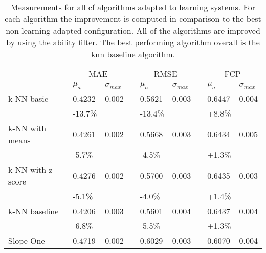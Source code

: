 \begin{sidewaystable}
    
    \centering
    \caption[Adapted collaborative filtering algorithms]{Measurements for all \gls{cf} algorithms adapted to learning systems. For each algorithm the improvement is computed in comparison to the best non-learning adapted configuration. All of the algorithms are improved by using the ability filter. The best performing algorithm overall is the \gls{knn} baseline algorithm.}
    \small
    \begin{tabular}{l ll l ll l ll}
                 & \multicolumn{2}{c}{MAE} &&
                 \multicolumn{2}{c}{RMSE} &&
                 \multicolumn{2}{c}{FCP} \\
    \cline{2-3} \cline{5-6} \cline{8-9}
    & $\mu_a$ & $\sigma_{max}$ && $\mu_a$ & $\sigma_{max}$ && $\mu_a$ & $\sigma_{max}$ \\
    \hline
    k-NN basic & 0.4232 & 0.002 && 0.5621 & 0.003 && 0.6447 & 0.004 \\
                  & \textcolor{scw-teal-darker}{-13.7\%} &&& \textcolor{scw-teal-darker}{-13.4\%}
                          &&& \textcolor{scw-teal-darker}{+8.8\%} \\
    k-NN with means  & 0.4261 & 0.002 && 0.5668 & 0.003 && 0.6434 & 0.005\\
                  & \textcolor{scw-teal-darker}{-5.7\%} &&& \textcolor{scw-teal-darker}{-4.5\%}
                          &&& \textcolor{scw-teal-darker}{+1.3\%} \\
    k-NN with z-score  & 0.4276 & 0.002 && 0.5700 & 0.003 && 0.6435 & 0.003\\
                  & \textcolor{scw-teal-darker}{-5.1\%} &&& \textcolor{scw-teal-darker}{-4.0\%}
                          &&& \textcolor{scw-teal-darker}{+1.4\%} \\
    k-NN baseline & \textcolor{scw-teal-darker}{0.4206} & 0.003 && 0.5601 & 0.004 && 0.6437 & 0.004\\
              & \textcolor{scw-teal-darker}{-6.8\%} &&& \textcolor{scw-teal-darker}{-5.5\%}
                      &&& \textcolor{scw-teal-darker}{+1.3\%} \\
    Slope One     & 0.4719 & 0.002 && 0.6029 & 0.003 && 0.6070 & 0.004 \\

\end{tabular}
\end{sidewaystable}
